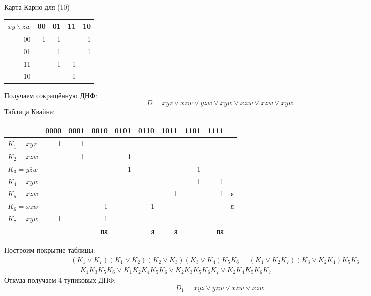 \documentclass[11pt]{article}
\begin{document}
Карта Карно для (10)
\begin{center}
\begin{tabular}{rrrrr}
\hline
\(xy\backslash zw\) & 00 & 01 & 11 & 10\\
\hline
00 & 1 & 1 &  & 1\\
01 &  & 1 &  & 1\\
11 &  & 1 & 1 & \\
10 &  &  & 1 & \\
\hline
\end{tabular}
\end{center}
Получаем сокращённую ДНФ:
\begin{equation}
D = \overline{x}\overline{y}\overline{z} \vee \overline{x}\overline{z}w \vee y\overline{z}w \vee
xyw \vee xzw \vee \overline{x}z\overline{w} \vee \overline{x}\overline{y}\overline{w}
\end{equation}
Таблица Квайна:
\begin{center}
\begin{tabular}{lrrrrrrrrl}
\hline
 & 0000 & 0001 & 0010 & 0101 & 0110 & 1011 & 1101 & 1111 & \\
\hline
\(K_1 = \overline{x}\overline{y}\overline{z}\) & 1 & 1 &  &  &  &  &  &  & \\
\(K_2 = \overline{x}\overline{z}w\) &  & 1 &  & 1 &  &  &  &  & \\
\(K_3 = y\overline{z}w\) &  &  &  & 1 &  &  & 1 &  & \\
\(K_4 = xyw\) &  &  &  &  &  &  & 1 & 1 & \\
\(K_5 = xzw\) &  &  &  &  &  & 1 &  & 1 & я\\
\(K_6 = \overline{x}z\overline{w}\) &  &  & 1 &  & 1 &  &  &  & я\\
\(K_7 = \overline{x}\overline{y}\overline{w}\) & 1 &  & 1 &  &  &  &  &  & \\
\hline
 &  &  & пя &  & я & я &  & пя & \\
\hline
\end{tabular}
\end{center}
Построим покрытие таблицы:
\begin{multline}
(K_1 \vee K_7)(K_1 \vee K_2)(K_2 \vee K_3)(K_3 \vee K_4)K_5K_6 = (K_1 \vee K_2K_7)(K_3 \vee K_2K_4)K_5K_6 = \\
= K_1K_3K_5K_6 \vee K_1K_2K_4K_5K_6 \vee K_2K_3K_5K_6K_7 \vee K_2K_4K_5K_6K_7
\end{multline}
Откуда получаем 4 тупиковых ДНФ:
\begin{equation}
D_1 = \overline{x}\overline{y}\overline{z} \vee y\overline{z}w \vee xzw \vee \overline{x}z\overline{w}
\end{equation}
\end{document}
